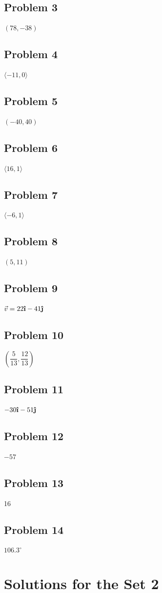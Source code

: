 \documentclass[12pt]{article}
\newcommand{\ihat}{\boldsymbol{\hat{\textbf{\i}}}}
\newcommand{\jhat}{\boldsymbol{\hat{\textbf{\j}}}}
\begin{document}
\subsection*{Problem 3}
\((78,-38)\)
\subsection*{Problem 4}
\(\langle -11,0 \rangle\)
\subsection*{Problem 5}
\((-40,40)\)
\subsection*{Problem 6}
\(\langle 16,1 \rangle\)
\subsection*{Problem 7}
\(\langle -6, 1 \rangle \)
\subsection*{Problem 8}
\((5,11)\)

\subsection*{Problem 9}
\(\vec{v}=22\ihat -41\jhat\)
\subsection*{Problem 10}
\((\dfrac{5}{13},\dfrac{12}{13})\)
\subsection*{Problem 11}
\(-30\ihat-51\jhat\)
\subsection*{Problem 12}
\(-57\)
\subsection*{Problem 13}
16
\subsection*{Problem 14}
\(106.3^{\circ}\)
\section*{Solutions for the Set 2}
\end{document}
